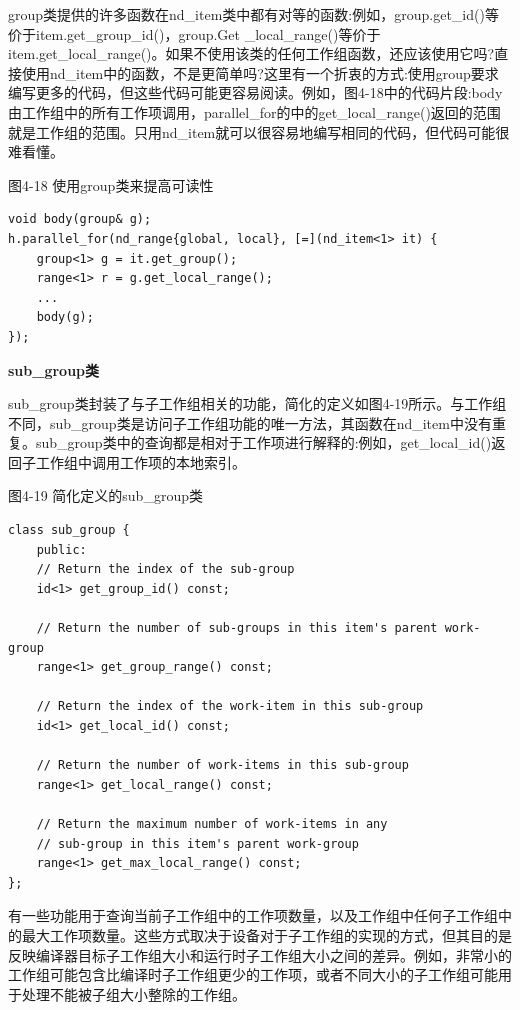 group类提供的许多函数在nd\_item类中都有对等的函数:例如，group.get\_id()等价于item.get\_group\_id()，group.Get \_local\_range()等价于item.get\_local\_range()。如果不使用该类的任何工作组函数，还应该使用它吗?直接使用nd\_item中的函数，不是更简单吗?这里有一个折衷的方式:使用group要求编写更多的代码，但这些代码可能更容易阅读。例如，图4-18中的代码片段:body由工作组中的所有工作项调用，parallel\_for的中的get\_local\_range()返回的范围就是工作组的范围。只用nd\_item就可以很容易地编写相同的代码，但代码可能很难看懂。\par

\hspace*{\fill} \par %
图4-18 使用group类来提高可读性
\begin{lstlisting}[caption={}]
void body(group& g);
h.parallel_for(nd_range{global, local}, [=](nd_item<1> it) {
	group<1> g = it.get_group();
	range<1> r = g.get_local_range();
	...
	body(g);
});
\end{lstlisting}

\hspace*{\fill} \par %
\textbf{sub\_group类}

sub\_group类封装了与子工作组相关的功能，简化的定义如图4-19所示。与工作组不同，sub\_group类是访问子工作组功能的唯一方法，其函数在nd\_item中没有重复。sub\_group类中的查询都是相对于工作项进行解释的:例如，get\_local\_id()返回子工作组中调用工作项的本地索引。\par

\hspace*{\fill} \par %
图4-19 简化定义的sub\_group类
\begin{lstlisting}[caption={}]
class sub_group {
	public:
	// Return the index of the sub-group
	id<1> get_group_id() const;
	
	// Return the number of sub-groups in this item's parent work-group
	range<1> get_group_range() const;
	
	// Return the index of the work-item in this sub-group
	id<1> get_local_id() const;
	
	// Return the number of work-items in this sub-group
	range<1> get_local_range() const;
	
	// Return the maximum number of work-items in any 
	// sub-group in this item's parent work-group
	range<1> get_max_local_range() const;
};
\end{lstlisting}

有一些功能用于查询当前子工作组中的工作项数量，以及工作组中任何子工作组中的最大工作项数量。这些方式取决于设备对于子工作组的实现的方式，但其目的是反映编译器目标子工作组大小和运行时子工作组大小之间的差异。例如，非常小的工作组可能包含比编译时子工作组更少的工作项，或者不同大小的子工作组可能用于处理不能被子组大小整除的工作组。\par





